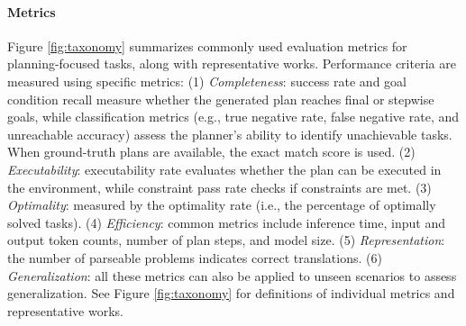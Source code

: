 \paragraph{Metrics}\;
Figure \ref{fig:taxonomy} summarizes commonly used evaluation metrics for planning-focused tasks, along with representative works. Performance criteria are measured using specific metrics: (1) \emph{Completeness}: success rate and goal condition recall measure whether the generated plan reaches final or stepwise goals, while classification metrics (e.g., true negative rate, false negative rate, and unreachable accuracy) assess the planner’s ability to identify unachievable tasks. When ground-truth plans are available, the exact match score is used. (2) \emph{Executability}: executability rate evaluates whether the plan can be executed in the environment, while constraint pass rate checks if constraints are met.  (3) \emph{Optimality}: measured by the optimality rate (i.e., the percentage of optimally solved tasks). (4) \emph{Efficiency}: common metrics include inference time, input and output token counts, number of plan steps, and model size.  (5) \emph{Representation}: the number of parseable problems indicates correct translations.  (6) \emph{Generalization}: all these metrics can also be applied to unseen scenarios to assess generalization. See Figure \ref{fig:taxonomy} for definitions of individual metrics and representative works.
